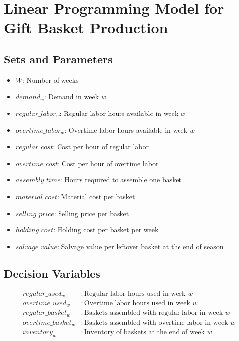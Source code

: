 \documentclass{article}
\begin{document}
\section*{Linear Programming Model for Gift Basket Production}

\subsection*{Sets and Parameters}
\begin{itemize}
    \item \( W \): Number of weeks
    \item \( demand_w \): Demand in week \( w \)
    \item \( regular\_labor_w \): Regular labor hours available in week \( w \)
    \item \( overtime\_labor_w \): Overtime labor hours available in week \( w \)
    \item \( regular\_cost \): Cost per hour of regular labor
    \item \( overtime\_cost \): Cost per hour of overtime labor
    \item \( assembly\_time \): Hours required to assemble one basket
    \item \( material\_cost \): Material cost per basket
    \item \( selling\_price \): Selling price per basket
    \item \( holding\_cost \): Holding cost per basket per week
    \item \( salvage\_value \): Salvage value per leftover basket at the end of season
\end{itemize}

\subsection*{Decision Variables}
\begin{align*}
    regular\_used_w & : \text{Regular labor hours used in week } w \\
    overtime\_used_w & : \text{Overtime labor hours used in week } w \\
    regular\_basket_w & : \text{Baskets assembled with regular labor in week } w \\
    overtime\_basket_w & : \text{Baskets assembled with overtime labor in week } w \\
    inventory_w & : \text{Inventory of baskets at the end of week } w
\end{align*}
\end{document}

